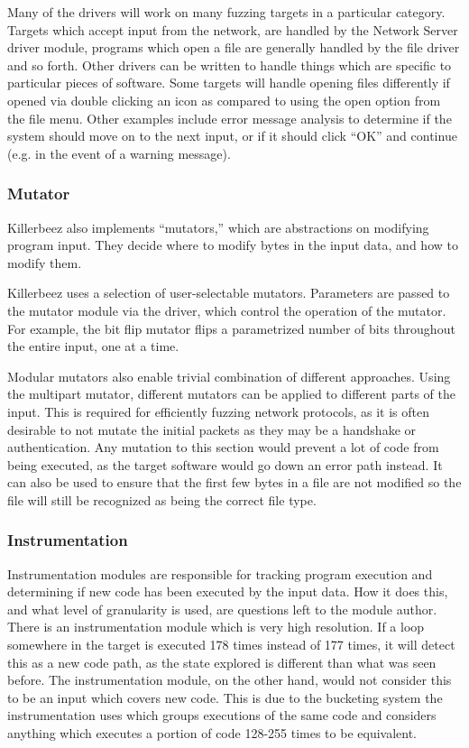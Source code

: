 Many of the drivers will work on many fuzzing targets in a particular category.
Targets which accept input from the network, are handled by the Network Server
driver module, programs which open a file are generally handled by the file
driver and so forth.  Other drivers can be written to handle things which are
specific to particular pieces of software.  Some targets will handle opening files
differently if opened via double clicking an icon as compared to using the open
option from the file menu. Other examples include error message analysis to
determine if the system should move on to the next input, or if it should click
``OK'' and continue (e.g. in the event of a warning message).

\subsubsection{Mutator} \label{Mutator Overview}
Killerbeez also implements ``mutators,'' which are abstractions on modifying
program input. They decide where to modify bytes in the input data, and how
to modify them.

Killerbeez uses a selection of user-selectable mutators. Parameters are passed
to the mutator module via the driver, which control the operation of the
mutator. For example, the bit flip mutator flips a parametrized number of bits
throughout the entire input, one at a time.

Modular mutators also enable trivial combination of different approaches. Using
the multipart mutator, different mutators can be applied to different parts of
the input. This is required for efficiently fuzzing network protocols, as it is
often desirable to not mutate the initial packets as they may be a handshake or
authentication.  Any mutation to this section would prevent a lot of code from being
executed, as the target software would go down an error path instead. It can
also be used to ensure that the first few bytes in a file are not modified so
the file will still be recognized as being the correct file type.


\subsubsection{Instrumentation} \label{Instrumentation Overview}
Instrumentation modules are responsible for tracking program execution and
determining if new code has been executed by the input data. How it does this,
and what level of granularity is used, are questions left to the module author.
There is an \IPT{} instrumentation module which is very high resolution.
If a loop somewhere in the target is executed 178 times instead of 177
times, it will detect this as a new code path, as the state explored is
different than what was seen before.  The \AFL{} instrumentation module, on the
other hand, would not consider this to be an input which covers new code. This
is due to the bucketing system the \AFL{} instrumentation uses which groups executions of the same
code and considers anything which executes a portion of code 128-255 times to
be equivalent.

